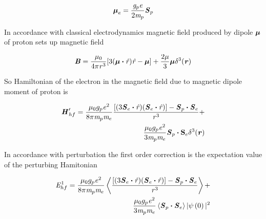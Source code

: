 \documentclass[fleqn,usenatbib]{mnras}
\begin{document}
\begin{equation}
 \mathit{\bmath{\umu}}_{e}=\frac{\mathit{g}_{p}\mathit{e}}{2\mathit{m}_{p}}\mathbfit{S}_{p}
\end{equation}

In accordance with classical electrodynamics magnetic field produced by dipole $\mathit{\bmath{\umu}}$ of proton sets up magnetic field

\begin{equation}
 \mathbfit{B}=\frac{\mathit{\umu}_{0}}{4\mathit{\upi}\-\mathit{r}^{3}}[3(\mathit{\bmath{\umu}}\bmath{\cdot}\mathit{\hat{r}})\mathit{\hat{r}}-\mathit{\bmath{\umu}}]+\frac{2\mathit{\umu}}{3}\mathit{\bmath{\umu}}\mathit{\delta}^{3}(\mathbfit{r})
\end{equation}

So Hamiltonian of the electron in the magnetic field due to magnetic dipole moment of proton is

\begin{equation}
\begin{split}
 \mathbfit{H}'_{hf}=\frac{\mathit{\umu}_{0}g_{p}\mathit{e}^{2}}{8\mathit{\upi}\mathit{m}_{p}\mathit{m}_{e}}\frac{[(3\mathbfit{S}_{e}\bmath{\cdot}\mathit{\hat{r}})(\mathbfit{S}_{e}\bmath{\cdot}\mathit{\hat{r}})]-\mathbfit{S}_{p}\bmath{\cdot}\mathbfit{S}_{e}}{\mathit{r}^{3}}+\\\frac{\mathit{\umu}_{0}g_{p}\mathit{e}^{2}}{3\mathit{m}_{p}\mathit{m}_{e}}\mathbfit{S}_{p}\bmath{\cdot}\mathbf{S}_{e}\delta^{3}(\mathbfit{r})
\end{split}  
\end{equation}

In accordance with perturbation the first order correction is the expectation value of the perturbing Hamitonian

\begin{equation}
\begin{split}
 \mathit{E}_{hf}^{1}=\frac{\mathit{\umu}_{0}g_{p}\mathit{e}^{2}}{8\mathit{\upi}\mathit{m}_{p}\mathit{m}_{e}}\left\langle\frac{[(3\mathbfit{S}_{e}\bmath{\cdot}\mathit{\hat{r}})(\mathbfit{S}_{e}\bmath{\cdot}\mathit{\hat{r}})]-\mathbfit{S}_{p}\bmath{\cdot}\mathbfit{S}_{e}}{\mathit{r}^{3}}\right\rangle+\\\frac{\mathit{\umu}_{0}g_{p}\mathit{e}^{2}}{3\mathit{m}_{p}\mathit{m}_{e}}\left\langle\mathbfit{S}_{p}\bmath{\cdot}\mathbfit{S}_{e}\right\rangle\vert\mathit{\psi}\left(0\right)\vert^{2}
\end{split} 
\end{equation}
\end{document}
